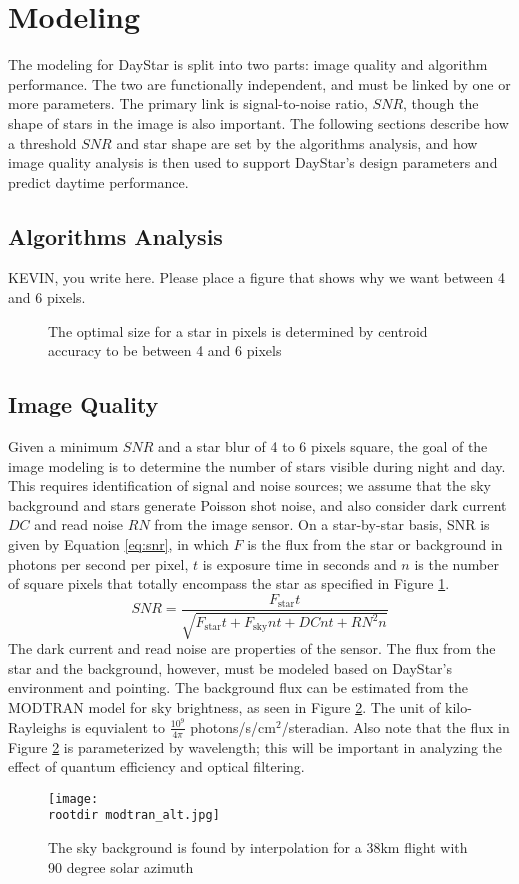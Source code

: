 \documentclass[twocolumn,letterpaper]{IEEEAerospace2012}
\newcommand{\rootdir}{./Figures/}
\newcommand{\RN}{\mathit{RN}}
\newcommand{\DC}{\mathit{DC}}
\newcommand{\SNR}{\mathit{SNR}}
\newcommand{\sub}[1]{\text{#1}} %
\begin{document}
\section{Modeling}
The modeling for DayStar is split into two parts: image quality and algorithm performance. The two are functionally independent, and must be linked by one or more parameters. The primary link is signal-to-noise ratio, $\SNR$, though the shape of stars in the image is also important. The following sections describe how a threshold $\SNR$ and star shape are set by the algorithms analysis, and how image quality analysis is then used to support DayStar's design parameters and predict daytime performance.

\subsection{Algorithms Analysis}
KEVIN, you write here.
Please place a figure that shows why we want between 4 and 6 pixels.
\begin{figure}
    \label{fig:blur}
    \caption{The optimal size for a star in pixels is determined by centroid accuracy to be between 4 and 6 pixels}
\end{figure}


\subsection{Image Quality}
Given a minimum $\SNR$ and a star blur of 4 to 6 pixels square, the goal of the image modeling is to determine the number of stars visible during night and day. This requires identification of signal and noise sources; we assume that the sky background and stars generate Poisson shot noise, and also consider dark current $\DC$ and read noise $\RN$ from the image sensor. On a star-by-star basis, SNR is given by Equation \ref{eq:snr}, in which $F$ is the flux from the star or background in photons per second per pixel, $t$ is exposure time in seconds and $n$ is the number of square pixels that totally encompass the star as specified in Figure \ref{fig:blur}.  
\begin{equation} 
    \label{eq:snr}
    \SNR = \frac{F_{\sub{star}}t}{\sqrt{F_{\sub{star}} t + F_{\sub{sky}} n t + \DC n t + \RN^2 n }}
\end{equation}
The dark current and read noise are properties of the sensor. The flux from the star and the background, however, must be modeled based on DayStar's environment and pointing. The background flux can be estimated from the MODTRAN model for sky brightness, as seen in Figure \ref{fig:modtran}. The unit of kilo-Rayleighs is equvialent to $\frac{10^{9}}{4\pi}$ photons/s/cm$^2$/steradian. Also note that the flux in Figure \ref{fig:modtran} is parameterized by wavelength; this will be important in analyzing the effect of quantum efficiency and optical filtering. %
\begin{figure}
    \label{fig:modtran}
    \texttt{[image: \\rootdir modtran\_alt.jpg]}
    \caption{The sky background is found by interpolation for a 38km flight with 90 degree solar azimuth}
\end{figure}
\end{document}
